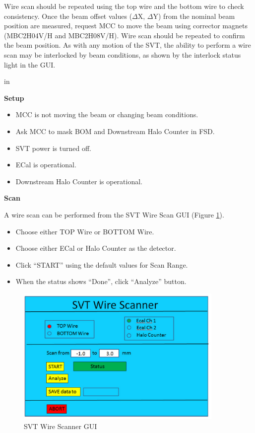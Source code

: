 \documentclass[12pt]{report}
\begin{document}
Wire scan should be repeated using the top wire and the bottom wire to check consistency. Once the beam offset values ($\Delta$X, $\Delta$Y) from the nominal beam position are measured, request MCC to move the beam using corrector magnets (MBC2H04V/H and MBC2H08V/H). Wire scan should be repeated to confirm the beam position.  As with any motion of the SVT, the ability to perform a wire scan may be interlocked by beam conditions, as shown by the interlock status light in the GUI.

 in

\noindent
\textbf{Setup}

\begin{itemize}
\item
MCC is not moving the beam or changing beam conditions.
\item
Ask MCC to mask BOM and Downstream Halo Counter in FSD.
\item
SVT power is turned off.
\item
ECal is operational.
\item
Downstream Halo Counter is operational.
\end{itemize}

\noindent
\textbf{Scan}

A wire scan can be performed from the SVT Wire Scan GUI (Figure \ref{scannergui}).

\begin{itemize}
\item 
Choose either TOP Wire or BOTTOM Wire.
\item
Choose either ECal or Halo Counter as the detector.
\item
Click ``START'' using the default values for Scan Range.
\item
When the status shows ``Done'', click ``Analyze'' button.
\end{itemize}

\begin{figure}[ht!]
\centering
\includegraphics[width=10cm]{WireScannerGUI.eps}
\caption{SVT Wire Scanner GUI}
\label{scannergui}
\end{figure}

\appendix
\end{document}
